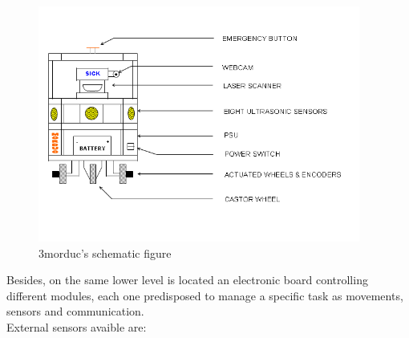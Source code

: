 \begin{figure}
  \begin{center}
    \includegraphics[width=300pt]{img/Morduc_scheme.png}
    \caption{3morduc's schematic figure}
    \label{fig:morduc_scheme}
  \end{center}
\end{figure}

Besides, on the same lower level is located an electronic board
controlling different modules, each one predisposed to manage a
specific task as movements, sensors and communication.
\\
External sensors avaible are:

